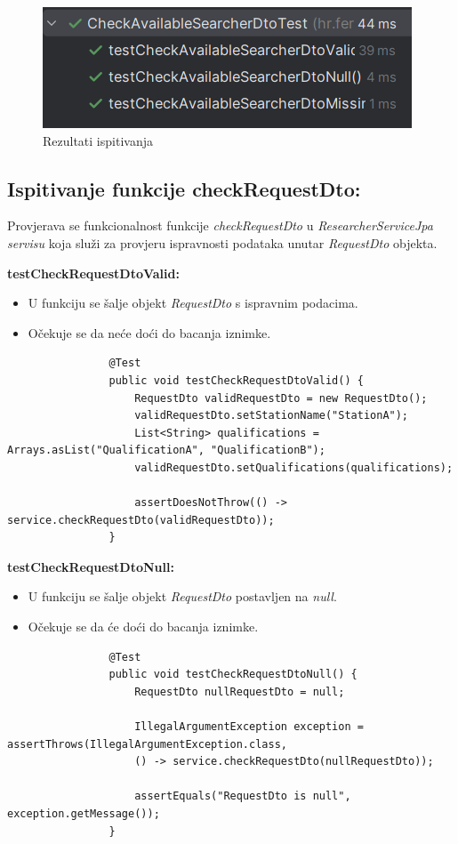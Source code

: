 			\begin{figure}[H]
				\includegraphics[scale=1]{slike/checkAvailableSearchersDtoTest.png} 
				\centering
				\caption{Rezultati ispitivanja}
				\label{fig:checkAvailableSearchersDtoTest}
			\end{figure}
			
			\subsection{Ispitivanje funkcije checkRequestDto:}
			Provjerava se funkcionalnost funkcije \textit{checkRequestDto} u \textit{ResearcherServiceJpa servisu} koja služi za provjeru ispravnosti podataka unutar \textit{RequestDto} objekta.
			
			\textbf{testCheckRequestDtoValid:}
			\begin{itemize}
				\item U funkciju se šalje objekt \textit{RequestDto} s ispravnim podacima.
				\item Očekuje se da neće doći do bacanja iznimke.
			\end{itemize}
			\begin{lstlisting}
				@Test
				public void testCheckRequestDtoValid() {
					RequestDto validRequestDto = new RequestDto();
					validRequestDto.setStationName("StationA");
					List<String> qualifications = Arrays.asList("QualificationA", "QualificationB");
					validRequestDto.setQualifications(qualifications);
					
					assertDoesNotThrow(() -> service.checkRequestDto(validRequestDto));
				}
			\end{lstlisting}
			
			\textbf{testCheckRequestDtoNull:}
			\begin{itemize}
				\item U funkciju se šalje objekt \textit{RequestDto} postavljen na \textit{null}.
				\item Očekuje se da će doći do bacanja iznimke.
			\end{itemize}
			\begin{lstlisting}
				@Test
				public void testCheckRequestDtoNull() {
					RequestDto nullRequestDto = null;
					
					IllegalArgumentException exception = assertThrows(IllegalArgumentException.class,
					() -> service.checkRequestDto(nullRequestDto));
					
					assertEquals("RequestDto is null", exception.getMessage());
				}
			\end{lstlisting}
			
